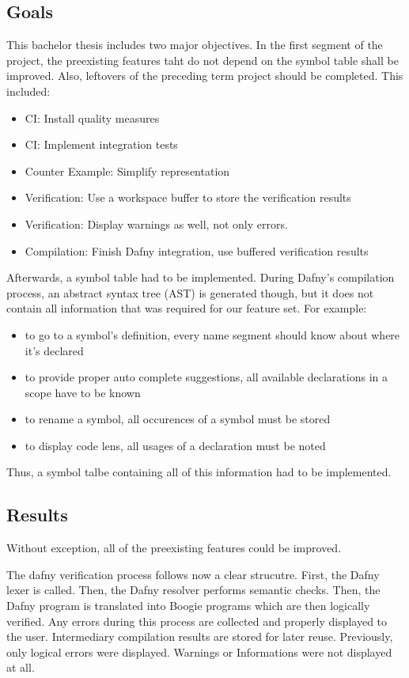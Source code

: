 \subsection{Goals}
This bachelor thesis includes two major objectives. In the first segment of the project, the preexisting features taht do not depend on the symbol table shall be improved. Also, leftovers of the preceding term project should be completed. This included:
\begin{itemize}
    \item CI: Install quality measures
    \item CI: Implement integration tests
    \item Counter Example: Simplify representation
    \item Verification: Use a workspace buffer to store the verification results
    \item Verification: Display warnings as well, not only errors.
    \item Compilation: Finish Dafny integration, use buffered verification results
\end{itemize}
Afterwards, a symbol table had to be implemented. During Dafny's compilation process, an abstract syntax tree (AST) is generated though, but it does not contain all information that was required for our feature set. For example:
\begin{itemize}
    \item to go to a symbol's definition, every name segment should know about where it's declared
    \item to provide proper auto complete suggestions, all available declarations in a scope have to be known
    \item to rename a symbol, all occurences of a symbol must be stored
    \item to display code lens, all usages of a declaration must be noted
\end{itemize}
Thus, a symbol talbe containing all of this information had to be implemented.

\subsection{Results}
Without exception, all of the preexisting features could be improved.

The dafny verification process follows now a clear strucutre. First, the Dafny lexer is called. Then, the Dafny resolver performs semantic checks. Then, the Dafny program is translated into Boogie programs which are then logically verified. Any errors during this process are collected and properly displayed to the user. Intermediary compilation results are stored for later reuse. Previously, only logical errors were displayed. Warnings or Informations were not displayed at all.

